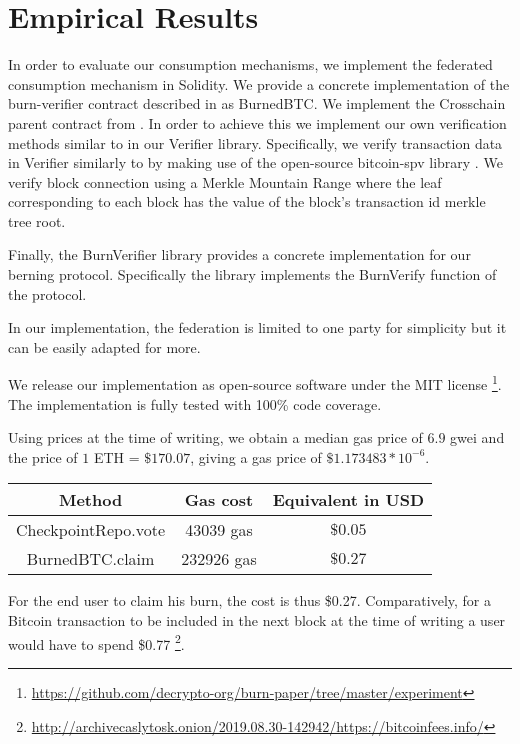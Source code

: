 \section{Empirical Results}

\newcommand{\rref}[1]{}

In order to evaluate our consumption mechanisms, we implement the federated consumption mechanism in Solidity. We provide a concrete implementation of the \textsf{burn-verifier} contract described in \rref{alg.burn-verifier} as \textsf{BurnedBTC}. We implement the \textsf{Crosschain} parent contract from \cite{pow-sidechains}. In order to achieve this we implement our own verification methods similar to \rref{alg.verify-event-federation} in our \textsf{Verifier} library. Specifically, we verify transaction data in \textsf{Verifier} similarly to \rref{alg.verify-tx} by making use of the open-source bitcoin-spv library \cite{bitcoin-spv-library}. We verify block connection using a Merkle Mountain Range where the leaf corresponding to each block has the value of the block's transaction id merkle tree root.

Finally, the \textsf{BurnVerifier} library provides a concrete implementation for our berning protocol. Specifically the library implements the \textsf{BurnVerify} function of the protocol.

In our implementation, the federation is limited to one party for simplicity but it can be easily adapted for more.

We release our implementation as open-source software under the MIT license
\footnote{\url{https://github.com/decrypto-org/burn-paper/tree/master/experiment}}.
The implementation is fully tested with 100\% code coverage.

Using prices at the time of writing, we obtain a median gas price of $6.9$ gwei and the price of $1$ ETH = $\$170.07$, giving a gas price of $\$1.173483 * 10^{-6}$.

\begin{center}
    \begin{tabular}{ |c|c|c| } 
     \hline
     Method & Gas cost & Equivalent in USD \\
     \hline
     \textsf{CheckpointRepo.vote} & 43039 gas & $\$0.05$ \\
     \textsf{BurnedBTC.claim} & 232926 gas & $\$0.27$ \\
     \hline
    \end{tabular}
\end{center}

For the end user to claim his burn, the cost is thus \$0.27. Comparatively, for a Bitcoin transaction to be included in the next block at the time of writing a user would have to spend \$0.77
\footnote{\url{http://archivecaslytosk.onion/2019.08.30-142942/https://bitcoinfees.info/}}.